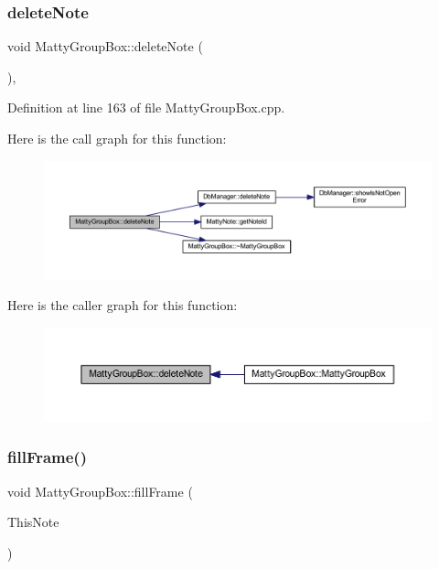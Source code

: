 \subsubsection{\texorpdfstring{delete\+Note}{deleteNote}}
{\footnotesize\ttfamily void Matty\+Group\+Box\+::delete\+Note (\begin{DoxyParamCaption}{ }\end{DoxyParamCaption})\hspace{0.3cm}{\ttfamily [private]}, {\ttfamily [slot]}}



Definition at line 163 of file Matty\+Group\+Box.\+cpp.

Here is the call graph for this function\+:
\nopagebreak
\begin{figure}[H]
\begin{center}
\leavevmode
\includegraphics[width=350pt]{classMattyGroupBox_ac7b7f1db6ea96e4c4b0f58fb87f86900_cgraph}
\end{center}
\end{figure}
Here is the caller graph for this function\+:
\nopagebreak
\begin{figure}[H]
\begin{center}
\leavevmode
\includegraphics[width=350pt]{classMattyGroupBox_ac7b7f1db6ea96e4c4b0f58fb87f86900_icgraph}
\end{center}
\end{figure}
\hypertarget{classMattyGroupBox_a4cbc1800e9ec63cdd0e064d3a3738b80}{}\label{classMattyGroupBox_a4cbc1800e9ec63cdd0e064d3a3738b80} 
\subsubsection{\texorpdfstring{fill\+Frame()}{fillFrame()}}
{\footnotesize\ttfamily void Matty\+Group\+Box\+::fill\+Frame (\begin{DoxyParamCaption}\item[{class \hyperlink{classMattyNote}{Matty\+Note} \&}]{This\+Note }\end{DoxyParamCaption})}



